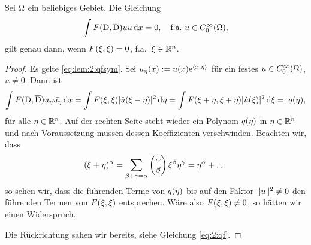 \begin{lem}\label{lem:2:qfsym}
Sei $\Omega$ ein beliebiges Gebiet.
Die Gleichung
\begin{equation}\label{eq:lem:2:qfsym}
\int F(\mathrm D,\overline{\mathrm D})u\bar{u}\,\mathrm d x=0,
\quad\text{f.a.}~u\in C^\infty_0(\Omega),
\end{equation}
gilt genau dann, wenn $F(\xi,\xi)=0$, f.a.~$\xi\in\mathbb R^n$.
\end{lem}
\begin{proof}
Es gelte \eqref{eq:lem:2:qfsym}.
Sei $u_\eta(x):=u(x)\mathrm e^{\langle x,\eta\rangle}$ für ein festes $u\in C^\infty_0(\Omega)$, $u\neq0$.
Dann ist
\begin{equation}
\int F(\mathrm D,\overline{\mathrm D})u_\eta\bar{u_\eta}\,\mathrm d x
=\int F(\xi,\xi)\lvert\hat{u}(\xi-\eta)\rvert^2\,\mathrm d \eta
=\int F(\xi+\eta,\xi+\eta)\lvert\hat{u}(\xi)\rvert^2\,\mathrm d \xi=:q(\eta),
\end{equation}
für alle $\eta\in\mathbb R^n$.
Auf der rechten Seite steht wieder ein Polynom $q(\eta)$ in $\eta\in\mathbb R^n$
und nach Voraussetzung müssen dessen Koeffizienten verschwinden.
Beachten wir, dass
\begin{equation}
(\xi+\eta)^\alpha=\sum_{\beta+\gamma=\alpha}\begin{pmatrix}\alpha\\\beta\end{pmatrix}\xi^\beta\eta^\gamma=\eta^\alpha+\dots
\end{equation}
so sehen wir, dass die führenden Terme von $q(\eta)$
bis auf den Faktor $\lVert u\rVert^2\neq0$ den führenden Termen von $F(\xi,\xi)$ entsprechen.
Wäre also $F(\xi,\xi)\neq0$, so hätten wir einen Widerspruch.

Die Rückrichtung sahen wir bereits, siehe Gleichung \eqref{eq:2:qf}.
\end{proof}

